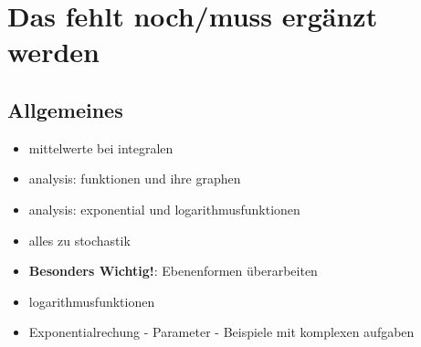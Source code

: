 \chapter{Das fehlt noch/muss ergänzt werden}
\section{Allgemeines}
\begin{itemize}
    \item mittelwerte bei integralen
    \item analysis: funktionen und ihre graphen
    \item analysis: exponential und logarithmusfunktionen
    \item alles zu stochastik
    \item \textbf{Besonders Wichtig!}: Ebenenformen überarbeiten 
    \item logarithmusfunktionen
    \item Exponentialrechung - Parameter - Beispiele mit komplexen aufgaben
\end{itemize}

